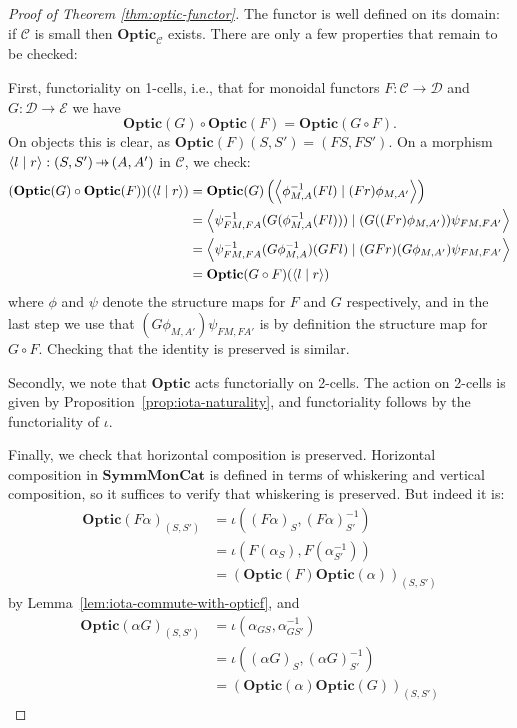 \documentclass[11pt,letterpaper]{article}
\theoremstyle{plain}
\theoremstyle{definition}
\newcommand{\C}{\mathscr{C}}
\newcommand{\D}{\mathscr{D}}
\newcommand{\E}{\mathscr{E}}
\newcommand{\SymmMonCat}{\mathbf{SymmMonCat}}
\newcommand{\Optic}{\mathbf{Optic}}
\newcommand{\rep}[2]{{\ensuremath \left\langle #1 \mid #2 \right\rangle}}
\newcommand{\hto}{\ensuremath{\,\mathaccent\shortmid\rightarrow\,}}
\begin{document}
\begin{proof}[Proof of Theorem \ref{thm:optic-functor}]
The functor is well defined on its domain: if $\C$ is small then $\Optic_\C$ exists. There are only a few properties that remain to be checked:

First, functoriality on 1-cells, i.e., that for monoidal functors $F : \C \to \D$ and $G : \D \to \E$ we have
\[ \Optic(G) \circ \Optic(F) = \Optic(G \circ F).\]
On objects this is clear, as $\Optic(F)(S, S') = (FS, FS')$. On a morphism $\rep{l}{r} : (S, S') \hto (A, A')$ in $\C$, we check:
\begin{align*}
(\Optic(G) \circ \Optic(F))(\rep{l}{r}) 
&= \Optic(G) \left(\rep{\phi^{-1}_{M,A} (Fl)}{(Fr) \phi_{M,A'}}\right) \\
&= \rep{\psi^{-1}_{FM,FA} (G(\phi^{-1}_{M,A} (Fl)))}{(G((Fr) \phi_{M,A'}))\psi_{FM,FA'}} \\
&= \rep{\psi^{-1}_{FM,FA} (G\phi^{-1}_{M,A}) (GFl)}{(GFr) (G\phi_{M,A'})\psi_{FM,FA'}} \\
&=\Optic(G \circ F)(\rep{l}{r})
\end{align*}
where $\phi$ and $\psi$ denote the structure maps for $F$ and $G$ respectively, and in the last step we use that $(G\phi_{M,A'})\psi_{FM,FA'}$ is by definition the structure map for $G \circ F$. Checking that the identity is preserved is similar.

Secondly, we note that $\Optic$ acts functorially on 2-cells. The action on 2-cells is given by Proposition~\ref{prop:iota-naturality}, and functoriality follows by the functoriality of $\iota$.

Finally, we check that horizontal composition is preserved. Horizontal composition in $\SymmMonCat$ is defined in terms of whiskering and vertical composition, so it suffices to verify that whiskering is preserved. But indeed it is:
\begin{align*}
\Optic(F\alpha)_{(S, S')} 
&= \iota((F\alpha)_{S}, (F\alpha)^{-1}_{S'}) \\
&= \iota(F(\alpha_{S}), F(\alpha_{S'}^{-1})) \\
&= (\Optic(F)\Optic(\alpha))_{(S, S')} 
\end{align*}
by Lemma~\ref{lem:iota-commute-with-opticf}, and
\begin{align*}
\Optic(\alpha G)_{(S, S')} 
&= \iota(\alpha_{GS}, \alpha_{GS'}^{-1}) \\
&= \iota((\alpha G)_{S}, (\alpha G)_{S'}^{-1}) \\
&= (\Optic(\alpha)\Optic(G))_{(S, S')} 
\end{align*}
\end{proof}
\end{document}
